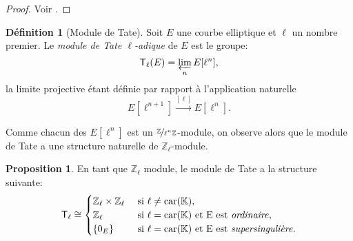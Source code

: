 \documentclass[10pt,a4paper]{book}
\theoremstyle{plain}
\theoremstyle{definition}
\theoremstyle{definition}
\theoremstyle{definition}
\theoremstyle{definition}
\newtheorem{prop}[thm]{Proposition}
\theoremstyle{definition}
\newtheorem{defi}[thm]{Définition}
\theoremstyle{remark}
\theoremstyle{remark}
\theoremstyle{definition}
\begin{document}
\begin{proof}
Voir \cite[Corrolary III.6.4]{Silv1}.
\end{proof}


\begin{defi}[Module de Tate]
Soit $E$ une courbe elliptique et $\ell$ un nombre premier. Le \emph{module de Tate $\ell$-adique} de $E$ est le groupe:
\begin{equation*}
\mathsf{T}_{\ell}(E)=\varprojlim_nE[\ell^n],
\end{equation*}
la limite projective étant définie par rapport à l'application naturelle
\begin{equation*}
E[\ell^{n+1}] \overset{[\ell]}{\rightarrow} E[\ell^n].
\end{equation*}
\end{defi}
Comme chacun des $E[\ell^n]$ est un $\nicefrac{\mathbb{Z}}{\ell^n\mathbb{Z}}$-module, on observe alors que le module de Tate a une structure naturelle de $\mathbb{Z}_{\ell}$-module.
\begin{prop}
En tant que $\mathbb{Z}_{\ell}$ module, le module de Tate a la structure suivante:
\begin{equation*}
\mathsf{T}_{\ell} \cong 
\begin{cases} 
\mathbb{Z}_{\ell} \times \mathbb{Z}_{\ell} &\text{ si } \ell \neq \mathrm{car}(\mathbb{K}), \\
\mathbb{Z}_{\ell} &\text{ si } \ell=\mathrm{car}(\mathbb{K})  \text{ et E est \emph{ordinaire}}, \\
\{0_E\} &\text{ si } \ell=\mathrm{car}(\mathbb{K})  \text{ et E est \emph{supersingulière}}.
\end{cases}
\end{equation*}
\end{prop}

\end{document}
